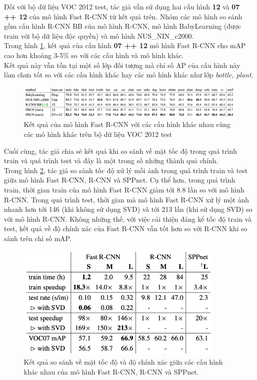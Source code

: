 {        \noindent
        Đối với bộ dữ liệu VOC 2012 test, tác giả vẫn sử dụng hai cấu hình \textbf{12} và \textbf{07 ++ 12} của mô hình Fast R-CNN từ kết quả trên. Nhóm các mô hình so sánh gồm cấu hình R-CNN BB của mô hình R-CNN, mô hình BabyLearning (được train với bộ dữ liệu độc quyền) và mô hình NUS\_NIN\_c2000. \\
        Trong hình \ref{fig:fast_rcnn_results_3}, kết quả của cấu hình \textbf{07 ++ 12} mô hình Fast R-CNN cho mAP cao hơn khoảng 3-5\% so với các cấu hình và mô hình khác. \\
        Kết quả này vẫn tồn tại một số lớp đối tượng mà chỉ số AP của cấu hình này làm chưa tốt so với các cấu hình khác hay các mô hình khác như lớp \textit{bottle, plant}.

        \begin{figure}[H]
            \centering
            \includegraphics[width=15cm] {images/fast_rcnn_results_3}
            \caption{Kết quả của mô hình Fast R-CNN với các cấu hình khác nhau cùng các mô hình khác trên bộ dữ liệu VOC 2012 test}
            \label{fig:fast_rcnn_results_3}
        \end{figure}

        \noindent
        Cuối cùng, tác giả chia sẻ kết quả khi so sánh về mặt tốc độ trong quá trình train và quá trình test và đây là một trong số những thành quả chính. \\
        Trong hình \ref{fig:fast_rcnn_results_4}, tác giả so sánh tốc độ xử lý mỗi ảnh trong quá trình train và test giữa mô hình Fast R-CNN, R-CNN và SPPnet.
        Cụ thể hơn, trong quá trình train, thời gian train của mô hình Fast R-CNN giảm tới 8.8 lần so với mô hình R-CNN.
        Trong quá trình test, thời gian mà mô hình Fast R-CNN xử lý một ảnh nhanh hơn tới 146 (khi không sử dụng SVD) và tới 213 lần (khi sử dụng SVD) so với mô hình R-CNN.
        Không những thế, với việc cải thiện đáng kể tốc độ train và test, kết quả về độ chính xác của Fast R-CNN vẫn tốt hơn so với R-CNN khi so sánh trên chỉ số mAP.

        \begin{figure}[H]
            \centering
            \includegraphics[width=10cm] {images/fast_rcnn_results_4}
            \caption{Kết quả so sánh về mặt tốc độ và độ chính xác giữa các cấu hình khác nhau của mô hình Fast R-CNN, R-CNN và SPPnet.}
            \label{fig:fast_rcnn_results_4}
        \end{figure}

}
